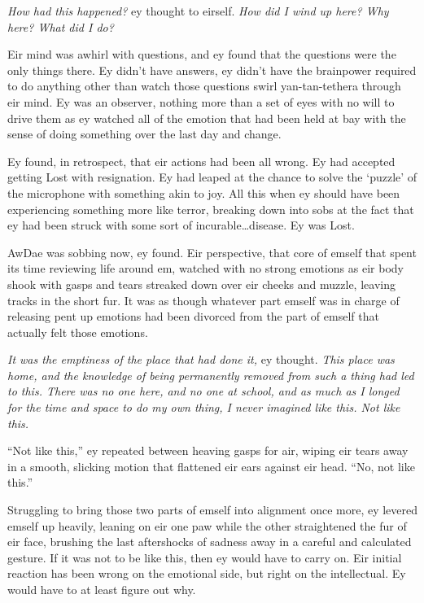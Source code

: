 \emph{How had this happened?} ey thought to eirself. \emph{How did I wind up here? Why here? What did I do?}

Eir mind was awhirl with questions, and ey found that the questions were the only things there. Ey didn't have answers, ey didn't have the brainpower required to do anything other than watch those questions swirl yan-tan-tethera through eir mind. Ey was an observer, nothing more than a set of eyes with no will to drive them as ey watched all of the emotion that had been held at bay with the sense of doing something over the last day and change.

Ey found, in retrospect, that eir actions had been all wrong. Ey had accepted getting Lost with resignation. Ey had leaped at the chance to solve the `puzzle' of the microphone with something akin to joy. All this when ey should have been experiencing something more like terror, breaking down into sobs at the fact that ey had been struck with some sort of incurable\ldots{}disease. Ey was Lost.

AwDae was sobbing now, ey found. Eir perspective, that core of emself that spent its time reviewing life around em, watched with no strong emotions as eir body shook with gasps and tears streaked down over eir cheeks and muzzle, leaving tracks in the short fur. It was as though whatever part emself was in charge of releasing pent up emotions had been divorced from the part of emself that actually felt those emotions.

\emph{It was the emptiness of the place that had done it,} ey thought. \emph{This place was home, and the knowledge of being permanently removed from such a thing had led to this. There was no one here, and no one at school, and as much as I longed for the time and space to do my own thing, I never imagined like this. Not like this.}

``Not like this,'' ey repeated between heaving gasps for air, wiping eir tears away in a smooth, slicking motion that flattened eir ears against eir head. ``No, not like this.''

Struggling to bring those two parts of emself into alignment once more, ey levered emself up heavily, leaning on eir one paw while the other straightened the fur of eir face, brushing the last aftershocks of sadness away in a careful and calculated gesture. If it was not to be like this, then ey would have to carry on. Eir initial reaction has been wrong on the emotional side, but right on the intellectual. Ey would have to at least figure out why.

